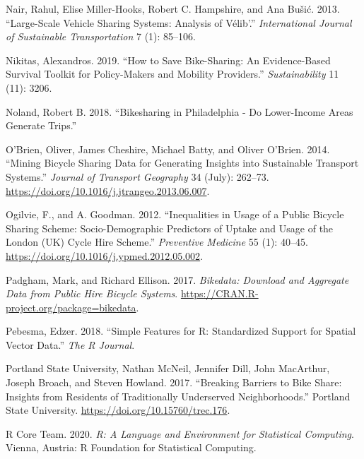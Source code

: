 \documentclass[
]{article}
\newlength{\cslhangindent}
\newenvironment{cslreferences}%
  {\setlength{\parindent}{0pt}%
  \everypar{\setlength{\hangindent}{\cslhangindent}}\ignorespaces}%
  {\par}
\begin{document}
\begin{cslreferences}
\leavevmode\hypertarget{ref-nair_large-scale_2013}{}%
Nair, Rahul, Elise Miller-Hooks, Robert C. Hampshire, and Ana Bušić. 2013. ``Large-Scale Vehicle Sharing Systems: Analysis of Vélib'.'' \emph{International Journal of Sustainable Transportation} 7 (1): 85--106.

\leavevmode\hypertarget{ref-nikitas_how_2019}{}%
Nikitas, Alexandros. 2019. ``How to Save Bike-Sharing: An Evidence-Based Survival Toolkit for Policy-Makers and Mobility Providers.'' \emph{Sustainability} 11 (11): 3206.

\leavevmode\hypertarget{ref-noland_bikesharing_2018}{}%
Noland, Robert B. 2018. ``Bikesharing in Philadelphia - Do Lower-Income Areas Generate Trips.''

\leavevmode\hypertarget{ref-obrien_mining_2014}{}%
O'Brien, Oliver, James Cheshire, Michael Batty, and Oliver O'Brien. 2014. ``Mining Bicycle Sharing Data for Generating Insights into Sustainable Transport Systems.'' \emph{Journal of Transport Geography} 34 (July): 262--73. \url{https://doi.org/10.1016/j.jtrangeo.2013.06.007}.

\leavevmode\hypertarget{ref-ogilvie_inequalities_2012}{}%
Ogilvie, F., and A. Goodman. 2012. ``Inequalities in Usage of a Public Bicycle Sharing Scheme: Socio-Demographic Predictors of Uptake and Usage of the London (UK) Cycle Hire Scheme.'' \emph{Preventive Medicine} 55 (1): 40--45. \url{https://doi.org/10.1016/j.ypmed.2012.05.002}.

\leavevmode\hypertarget{ref-padgham_bikedata:_2017}{}%
Padgham, Mark, and Richard Ellison. 2017. \emph{Bikedata: Download and Aggregate Data from Public Hire Bicycle Systems}. \url{https://CRAN.R-project.org/package=bikedata}.

\leavevmode\hypertarget{ref-pebesma_simple_2018}{}%
Pebesma, Edzer. 2018. ``Simple Features for R: Standardized Support for Spatial Vector Data.'' \emph{The R Journal}.

\leavevmode\hypertarget{ref-portland_state_university_breaking_2017}{}%
Portland State University, Nathan McNeil, Jennifer Dill, John MacArthur, Joseph Broach, and Steven Howland. 2017. ``Breaking Barriers to Bike Share: Insights from Residents of Traditionally Underserved Neighborhoods.'' Portland State University. \url{https://doi.org/10.15760/trec.176}.

\leavevmode\hypertarget{ref-R-base}{}%
R Core Team. 2020. \emph{R: A Language and Environment for Statistical Computing}. Vienna, Austria: R Foundation for Statistical Computing.


\end{cslreferences}
\end{document}
